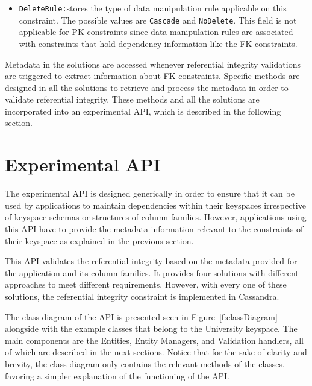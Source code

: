\begin{itemize}
  \item \texttt{DeleteRule:}stores the type of data manipulation rule applicable
  on this constraint. The possible values are  \texttt{Cascade} and
  \texttt{NoDelete}.  This field is not applicable  for \ac{PK} constraints
   since data manipulation rules are associated with constraints that hold
  dependency information like the \ac{FK} constraints.
  
\end{itemize}

Metadata in the solutions are accessed whenever referential integrity
validations are triggered to extract information about \ac{FK} constraints. 
Specific methods are designed in all the solutions to retrieve and process the
metadata in order to validate referential integrity.  These methods and all the
solutions are incorporated  into an experimental \ac{API}, which is
described in the following section.

\section{Experimental API}\label{s:API}

The experimental \ac{API} is designed generically in order to ensure
that it can be used by  applications to maintain dependencies within their
keyspaces irrespective of keyspace schemas or structures of column
families. However, applications using this \ac{API}  have to provide
 the metadata information relevant to the constraints of their keyspace as
 explained in the previous section. 

This \ac{API} validates the referential integrity based on the metadata provided
for the application and its column families.  It  provides  four solutions
with different approaches to meet different requirements. However, with 
 every one of these solutions,  the referential integrity constraint is
 implemented in Cassandra.

The  class diagram of the \ac{API} is presented seen in
 Figure~\ref{f:classDiagram} alongside with the example classes that belong to 
the University keyspace. The main components are the Entities, Entity Managers,
and Validation handlers, all of which are described in the next sections.  
 Notice that for the sake of clarity and brevity,  the class diagram only
 contains  the relevant  methods of the classes, favoring a simpler
explanation of the functioning of the \ac{API}.

